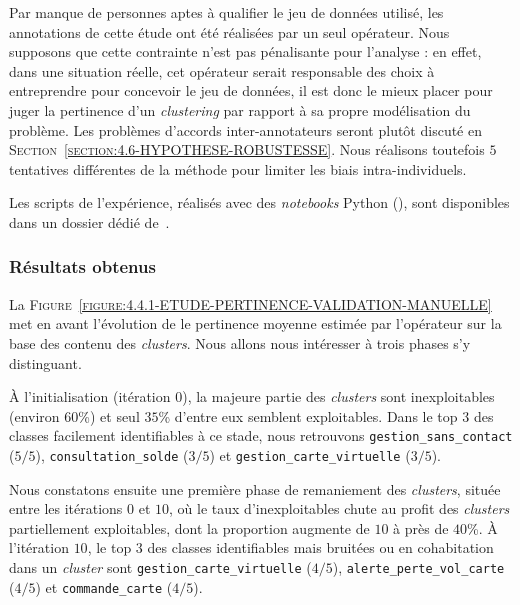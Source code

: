 			\begin{leftBarWarning}
				Par manque de personnes aptes à qualifier le jeu de données utilisé, les annotations de cette étude ont été réalisées par un seul opérateur.
				Nous supposons que cette contrainte n'est pas pénalisante pour l'analyse : en effet, dans une situation réelle, cet opérateur serait responsable des choix à entreprendre pour concevoir le jeu de données, il est donc le mieux placer pour juger la pertinence d'un \textit{clustering} par rapport à sa propre modélisation du problème.
				Les problèmes d'accords inter-annotateurs seront plutôt discuté en \textsc{Section~\ref{section:4.6-HYPOTHESE-ROBUSTESSE}}.
				Nous réalisons toutefois $5$ tentatives différentes de la méthode pour limiter les biais intra-individuels.
			\end{leftBarWarning}
			
			\begin{leftBarInformation}
				Les scripts de l'expérience, réalisés avec des \textit{notebooks} Python (\cite{van-rossum-drake:2009:python-reference-manual}), sont disponibles dans un dossier dédié de~\cite{schild:2021:cognitivefactory-interactiveclusteringcomparativestudy}.
			\end{leftBarInformation}
			

		\subsubsection{Résultats obtenus}
		
			La \textsc{Figure~\ref{figure:4.4.1-ETUDE-PERTINENCE-VALIDATION-MANUELLE}} met en avant l'évolution de le pertinence moyenne estimée par l'opérateur sur la base des contenu des \textit{clusters}.
			Nous allons nous intéresser à trois phases s'y distinguant.
			
			À l'initialisation (itération $0$), la majeure partie des \textit{clusters} sont inexploitables (environ $60$\%) et seul $35$\% d'entre eux semblent exploitables.
			Dans le top $3$ des classes facilement identifiables à ce stade, nous retrouvons \texttt{gestion\_sans\_contact} ($5/5$), \texttt{consultation\_solde} ($3/5$) et \texttt{gestion\_carte\_virtuelle} ($3/5$).
			
			Nous constatons ensuite une première phase de remaniement des \textit{clusters}, située entre les itérations $0$ et $10$, où le taux d'inexploitables chute au profit des \textit{clusters} partiellement exploitables, dont la proportion augmente de $10$ à près de $40$\%.
			À l'itération $10$, le top $3$ des classes identifiables mais bruitées ou en cohabitation dans un \textit{cluster} sont \texttt{gestion\_carte\_virtuelle} ($4/5$),  \texttt{alerte\_perte\_vol\_carte} ($4/5$) et  \texttt{commande\_carte} ($4/5$).
			
